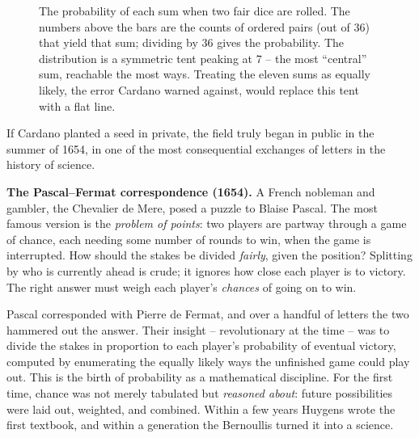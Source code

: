 \begin{figure}[H]
\centering
{}
\caption{The probability of each sum when two fair dice are rolled. The numbers
above the bars are the counts of ordered pairs (out of $36$) that yield that sum;
dividing by $36$ gives the probability. The distribution is a symmetric tent
peaking at $7$ -- the most ``central'' sum, reachable the most ways. Treating the
eleven sums as equally likely, the error Cardano warned against, would replace this
tent with a flat line.}
\label{ch01:fig-dice}
\end{figure}

If Cardano planted a seed in private, the field truly began in public in the summer
of 1654, in one of the most consequential exchanges of letters in the history of
science.

\begin{historybox}
\textbf{The Pascal--Fermat correspondence (1654).} A French nobleman and gambler,
the Chevalier de Mere, posed a puzzle to Blaise Pascal. The most famous version is
the \emph{problem of points}: two players are partway through a game of chance,
each needing some number of rounds to win, when the game is interrupted. How should
the stakes be divided \emph{fairly}, given the position? Splitting by who is
currently ahead is crude; it ignores how close each player is to victory. The right
answer must weigh each player's \emph{chances} of going on to win.

Pascal corresponded with Pierre de Fermat, and over a handful of letters the two
hammered out the answer. Their insight -- revolutionary at the time -- was to divide
the stakes in proportion to each player's probability of eventual victory,
computed by enumerating the equally likely ways the unfinished game could play out.
This is the birth of probability as a mathematical discipline. For the first time,
chance was not merely tabulated but \emph{reasoned about}: future possibilities
were laid out, weighted, and combined. Within a few years Huygens wrote the first
textbook, and within a generation the Bernoullis turned it into a science.
\end{historybox}

